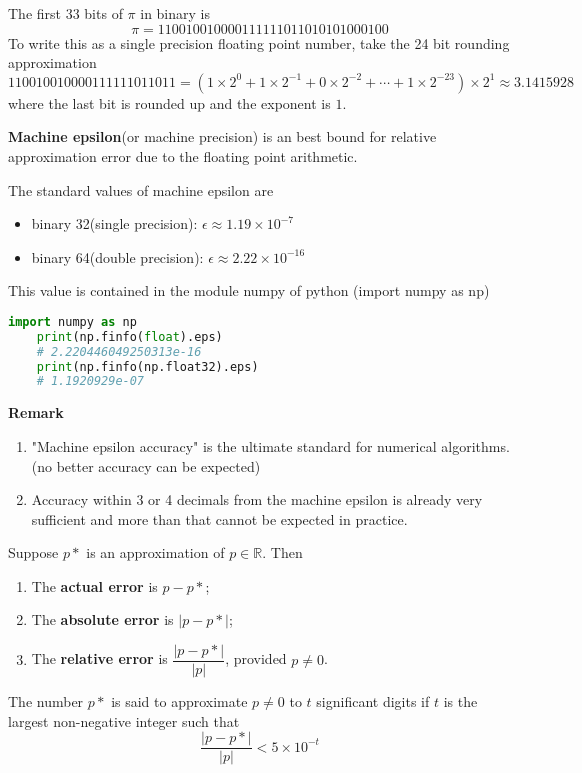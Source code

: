 \documentclass[main.tex]{subfiles}
\begin{document}
\begin{example}
    The first $33$ bits of $\pi$ in binary is
    \begin{equation}
        \pi = 110010010000111111011010101000100
    \end{equation}
    To write this as a single precision floating point number, take the 24 bit rounding approximation 
    \begin{equation}
        110010010000111111011011 = (1\times 2^0 + 1\times 2^{-1} + 0\times 2^{-2} + \cdots + 1\times 2^{-23})\times 2^1 \approx 3.1415928
    \end{equation}
    where the last bit is rounded up and the exponent is $1$.  
\end{example}
\par \textbf{Machine epsilon}(or machine precision) is an best bound for relative approximation error due to the floating point arithmetic. 
\par The standard values of machine epsilon are
\begin{itemize}
    \item binary 32(single precision): $\epsilon \approx 1.19 \times 10^{-7}$
    \item binary 64(double precision): $\epsilon \approx 2.22 \times 10^{-16}$
\end{itemize}
\par This value is contained in the module numpy of python (import numpy as np) 
\begin{lstlisting}[language = Python]
    import numpy as np
    print(np.finfo(float).eps)
    # 2.220446049250313e-16
    print(np.finfo(np.float32).eps)
    # 1.1920929e-07
\end{lstlisting}
\par \noindent \textbf{Remark} 
\begin{enumerate}
    \item "Machine epsilon accuracy" is the ultimate standard for numerical algorithms. (no better accuracy can be expected)
    \item Accuracy within $3$ or 4 decimals from the machine epsilon is already very sufficient and more than that cannot be expected in practice. 
\end{enumerate}

\begin{definition}
    Suppose $p*$ is an approximation of $p\in \mathbb{R}$. Then 
    \begin{enumerate}
        \item The \textbf{actual error} is $p - p*$;
        \item The \textbf{absolute error} is $|p - p*|$;
        \item The \textbf{relative error} is $\dfrac{|p - p*|}{|p|}$, provided $p\neq 0$.
    \end{enumerate}
    The number $p*$ is said to approximate $p\neq 0$ to $t$ significant digits if $t$ is the largest non-negative integer such that 
    \begin{equation}
        \dfrac{|p - p*|}{|p|} < 5 \times 10^{-t} 
    \end{equation} 
\end{definition}
\end{document}

